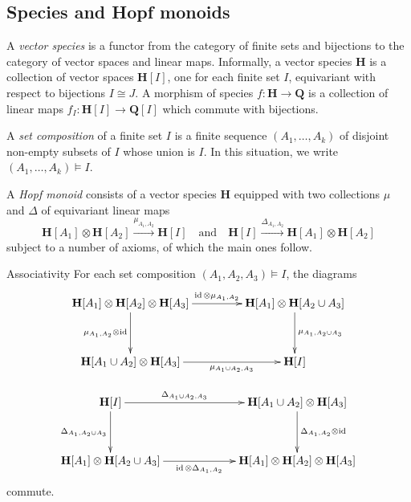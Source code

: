\documentclass[ALCO,ThmDefs,Unicode,epreuves]{cedram}
\newenvironment{associativity}{\begin{enonce*}[remark]{Associativity}}{\end{enonce*}}
\DeclareMathOperator{\id}{id}
\let\map=\xrightarrow
\newcommand{\bH}{\mathbf{H}}
\newcommand{\qand}{\quad\text{and}\quad}
\begin{document}
\subsection{Species and Hopf monoids}\label{ss:sp-hopf}
A \emph{vector species} is a functor from the category of finite sets and bijections to the category of vector spaces and linear maps. Informally, a {vector species} $\bH$ is a collection of vector spaces $\bH[I]$,
one for each finite set $I$, equivariant with respect to bijections $I\cong J$.
A morphism of species $f:\bH\to\mathbf{Q}$ is a collection of linear maps
$f_I:\bH[I]\to{\mathbf{Q}}[I]$ which commute with bijections.

A \emph{set composition} of a finite set $I$ is a finite sequence $(A_1,\ldots,A_k)$
of disjoint non-empty subsets of $I$ whose union is $I$. In this situation, we write
$
(A_1,\ldots,A_k)\models I.
$

A \emph{Hopf monoid} consists of a vector species $\bH$
equipped with two collections $\mu$ and $\Delta$ of equivariant linear maps
\[
\bH[A_1]\otimes\bH[A_2] \map{\mu_{A_1,A_2}}\bH[I]
\qand
\bH[I]\map{\Delta_{A_1,A_2}} \bH[A_1]\otimes\bH[A_2]
\]
subject to a number of axioms, of which the main ones follow.

\begin{associativity}
For each set composition $(A_1, A_2, A_3)\models I$, the diagrams
\begin{equation}\label{e:assoc}
\begin{gathered}
\xymatrix@R+1pc@C+20pt{
\bH[A_1]\otimes\bH[A_2]\otimes\bH[A_3]\ar[r]^-{\id\otimes\mu_{A_1,A_2}}
\ar[d]_{\mu_{A_1,A_2}\otimes\id} & \bH[A_1]\otimes\bH[A_2\cup A_3]\ar[d]^{\mu_{A_1,A_2\cup A_3}} \\
\bH[A_1\cup A_2]\otimes \bH[A_3]\ar[r]_-{\mu_{A_1\cup A_2,A_3}} & \bH[I]
}
\end{gathered}
\end{equation}

\begin{equation}
\label{e:coassoc}
\begin{gathered}
\xymatrix@R+1pc@C+40pt{
\bH[I]\ar[r]^-{\Delta_{A_1\cup A_2,A_3}} \ar[d]_{\Delta_{A_1,A_2\cup A_3}}
& \bH[A_1\cup A_2]\otimes \bH[A_3]\ar[d]^{\Delta_{A_1,A_2}\otimes\id}
\\
\bH[A_1]\otimes\bH[A_2\cup A_3]\ar[r]_-{\id\otimes\Delta_{A_1,A_2}}
& \bH[A_1]\otimes\bH[A_2]\otimes\bH[A_3]
}
\end{gathered}
\end{equation}
commute.
\end{associativity}
\end{document}
